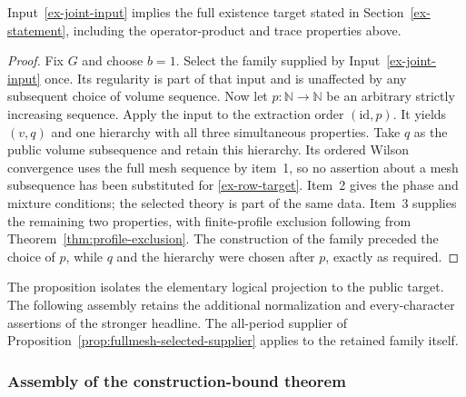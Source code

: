 \begin{proposition}\label{ex-conditional-existence}
Input~\ref{ex-joint-input} implies the full existence target stated in
Section~\ref{ex-statement}, including the operator-product and trace
properties above.
\end{proposition}
\begin{proof}
Fix \(G\) and choose \(b=1\). Select the family supplied by
Input~\ref{ex-joint-input} once. Its regularity is part of that input and
is unaffected by any subsequent choice of volume sequence. Now let
\(p:\mathbb N\to\mathbb N\) be an arbitrary strictly increasing
sequence. Apply the input to the extraction order \((\mathrm{id},p)\).
It yields \((v,q)\) and one hierarchy with all three simultaneous
properties. Take \(q\) as the public volume subsequence and retain this
hierarchy. Its ordered Wilson convergence uses the full mesh sequence by
item~1, so no assertion about a mesh subsequence has been substituted for
\eqref{ex-row-target}. Item~2 gives the phase and mixture conditions;
the selected theory is part of the same data. Item~3 supplies the remaining
two properties, with finite-profile exclusion following from
Theorem~\ref{thm:profile-exclusion}. The construction of the family preceded the choice of
\(p\), while \(q\) and the hierarchy were chosen after \(p\), exactly
as required.
\end{proof}

The proposition isolates the elementary logical projection to the public
target. The following assembly retains the additional normalization and
every-character assertions of the stronger headline. The all-period
supplier of Proposition~\ref{prop:fullmesh-selected-supplier} applies
to the retained family itself.

\subsubsection{Assembly of the construction-bound theorem}

